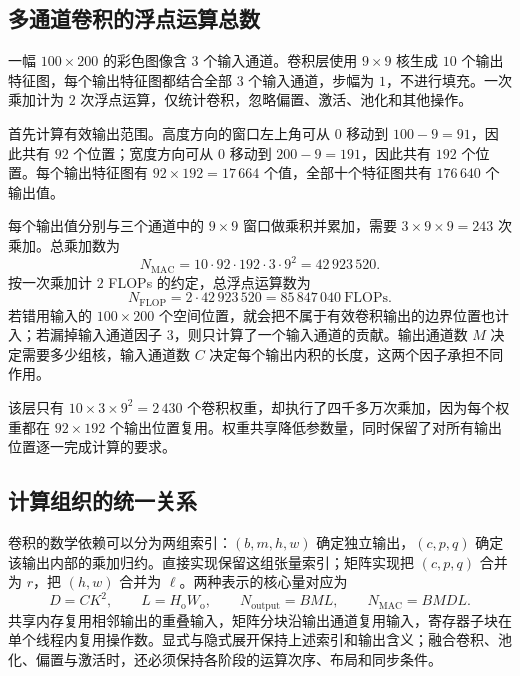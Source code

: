 \subsection{多通道卷积的浮点运算总数}
\label{l11:subsec:flop_problem}

一幅 $100\times200$ 的彩色图像含 $3$ 个输入通道。卷积层使用 $9\times9$ 核生成 $10$ 个输出特征图，每个输出特征图都结合全部 $3$ 个输入通道，步幅为 $1$，不进行填充。一次乘加计为 $2$ 次浮点运算，仅统计卷积，忽略偏置、激活、池化和其他操作。

首先计算有效输出范围。高度方向的窗口左上角可从 $0$ 移动到 $100-9=91$，因此共有 $92$ 个位置；宽度方向可从 $0$ 移动到 $200-9=191$，因此共有 $192$ 个位置。每个输出特征图有 $92\times192=17\,664$ 个值，全部十个特征图共有 $176\,640$ 个输出值。

每个输出值分别与三个通道中的 $9\times9$ 窗口做乘积并累加，需要 $3\times9\times9=243$ 次乘加。总乘加数为
\begin{equation}
  N_{\mathrm{MAC}}
  =10\cdot92\cdot192\cdot3\cdot9^2
  =42\,923\,520.
  \label{l11:eq:flop_problem_mac}
\end{equation}
按一次乘加计 $2$ FLOPs 的约定，总浮点运算数为
\begin{equation}
  N_{\mathrm{FLOP}}
  =2\cdot42\,923\,520
  =\boxed{85\,847\,040\ \text{FLOPs}}.
  \label{l11:eq:flop_problem_result}
\end{equation}
若错用输入的 $100\times200$ 个空间位置，就会把不属于有效卷积输出的边界位置也计入；若漏掉输入通道因子 $3$，则只计算了一个输入通道的贡献。输出通道数 $M$ 决定需要多少组核，输入通道数 $C$ 决定每个输出内积的长度，这两个因子承担不同作用。

该层只有 $10\times3\times9^2=2\,430$ 个卷积权重，却执行了四千多万次乘加，因为每个权重都在 $92\times192$ 个输出位置复用。权重共享降低参数量，同时保留了对所有输出位置逐一完成计算的要求。

\subsection{计算组织的统一关系}
\label{l11:subsec:synthesis}

卷积的数学依赖可以分为两组索引：$(b,m,h,w)$ 确定独立输出，$(c,p,q)$ 确定该输出内部的乘加归约。直接实现保留这组张量索引；矩阵实现把 $(c,p,q)$ 合并为 $r$，把 $(h,w)$ 合并为 $\ell$。两种表示的核心量对应为
\begin{equation}
  D=CK^2,\qquad L=H_{\mathrm{o}}W_{\mathrm{o}},\qquad
  N_{\mathrm{output}}=BML,\qquad
  N_{\mathrm{MAC}}=BMDL.
  \label{l11:eq:core_relations}
\end{equation}
共享内存复用相邻输出的重叠输入，矩阵分块沿输出通道复用输入，寄存器子块在单个线程内复用操作数。显式与隐式展开保持上述索引和输出含义；融合卷积、池化、偏置与激活时，还必须保持各阶段的运算次序、布局和同步条件。
